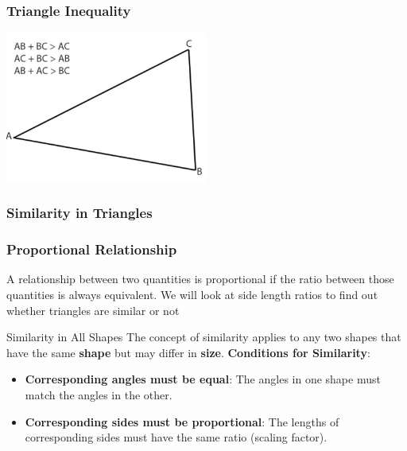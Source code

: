 \documentclass{beamer}
\begin{document}
\begin{frame}
    \frametitle{Triangle Inequality}
    \begin{center}
        \includegraphics[width=0.5\textwidth]{triangle_inequality.jpeg} 
    \end{center}
\end{frame}

\begin{frame}
    \frametitle{Similarity in Triangles}
\end{frame}



\begin{frame}
    \frametitle{Proportional Relationship}
    A relationship between two quantities is proportional if the ratio between those quantities is always equivalent. We will look at side length ratios to find out whether triangles are similar or not
\end{frame}

\begin{frame}{Similarity in All Shapes}
  The concept of similarity applies to any two shapes that have the same \textbf{shape} but may differ in \textbf{size}.
    \vspace{10pt}
    \textbf{Conditions for Similarity}:
    \begin{itemize}
        \item \textbf{Corresponding angles must be equal}: The angles in one shape must match the angles in the other.
        \item \textbf{Corresponding sides must be proportional}: The lengths of corresponding sides must have the same ratio (scaling factor).
    \end{itemize}
\end{frame}
\end{document}
